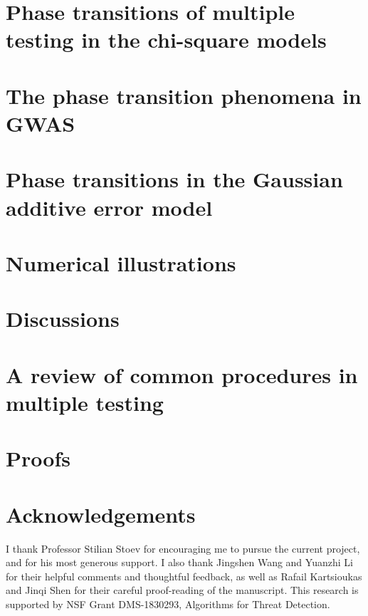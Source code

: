 \documentclass[ejs, preprint]{imsart}
\numberwithin{equation}{section}
\theoremstyle{plain}
\theoremstyle{definition}
\theoremstyle{remark}
\begin{document}
\section{Phase transitions of multiple testing in the chi-square models}
\label{sec:chisq-boundaries}


\section{The phase transition phenomena in GWAS}
\label{sec:signal-size-odds-ratio}


\section{Phase transitions in the Gaussian additive error model}
\label{sec:additive-error-model-boundaries}


\section{Numerical illustrations}
\label{sec:numerical}


\section{Discussions}
\label{sec:discussions}


\appendix

\section{A review of common procedures in multiple testing}
\label{sec:procedures}


\section{Proofs}
\label{sec:proofs}



\section*{Acknowledgements}
I thank Professor Stilian Stoev for encouraging me to pursue the current project, and for his most generous support.
I also thank Jingshen Wang and Yuanzhi Li for their helpful comments and thoughtful feedback, as well as Rafail Kartsioukas and Jinqi Shen for their careful proof-reading of the manuscript.
This research is supported by NSF Grant DMS-1830293, Algorithms for Threat Detection.


\end{document}
